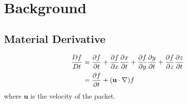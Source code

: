 \section{Background}
\subsection{Material Derivative}
\begin{align}
    \frac{Df}{Dt} &= \frac{\partial f}{\partial t}+\frac{\partial f}{\partial x}
    \frac{\partial x}{\partial t}+\frac{\partial f}{\partial
    y}\frac{\partial y}{\partial t}+\frac{\partial f}{\partial
    z}\frac{\partial z}{\partial t}\notag\\
    &= \frac{\partial f}{\partial
    t}+(\mathbf{u}\cdot\nabla)f
\end{align}
where $\mathbf{u}$ is the velocity of the packet.

